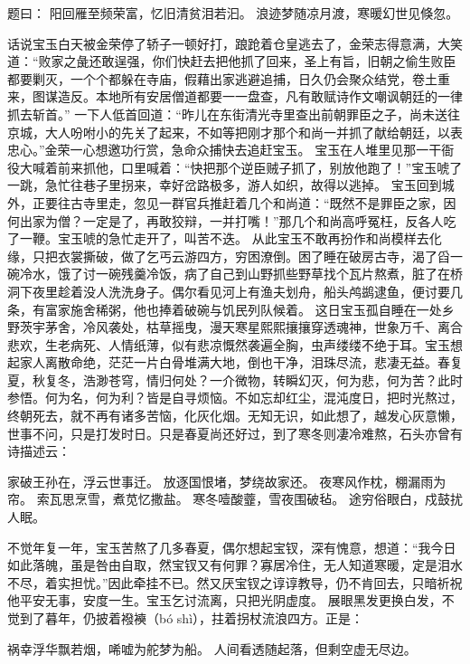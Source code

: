 \documentclass[12pt,oneside]{book}
\begin{document}
题曰：
阳回雁至频荣富，忆旧清贫泪若汩。
浪迹梦随凉月渡，寒暖幻世见倏忽。

话说宝玉白天被金荣停了轿子一顿好打，踉跄着仓皇逃去了，金荣志得意满，大笑道：“败家之彘还敢逞强，你们快赶去把他抓了回来，圣上有旨，旧朝之偷生败臣都要剿灭，一个个都躲在寺庙，假藉出家逃避追捕，日久仍会聚众结党，卷土重来，图谋造反。本地所有安居僧道都要一一盘查，凡有敢赋诗作文嘲讽朝廷的一律抓去斩首。”
一下人低首回道：“昨儿在东街清光寺里查出前朝罪臣之子，尚未送往京城，大人吩咐小的先关了起来，不如等把刚才那个和尚一并抓了献给朝廷，以表忠心。”金荣一心想邀功行赏，急命众捕快去追赶宝玉。
宝玉在人堆里见那一干衙役大喊着前来抓他，口里喊着：“快把那个逆臣贼子抓了，别放他跑了！”宝玉唬了一跳，急忙往巷子里拐来，幸好岔路极多，游人如织，故得以逃掉。
宝玉回到城外，正要往古寺里走，忽见一群官兵推赶着几个和尚道：“既然不是罪臣之家，因何出家为僧？一定是了，再敢狡辩，一并打嘴！”那几个和尚高呼冤枉，反各人吃了一鞭。宝玉唬的急忙走开了，叫苦不迭。
从此宝玉不敢再扮作和尚模样去化缘，只把衣裳撕破，做了乞丐云游四方，穷困潦倒。困了睡在破房古寺，渴了舀一碗冷水，饿了讨一碗残羹冷饭，病了自己到山野抓些野草找个瓦片熬煮，脏了在桥洞下夜里趁着没人洗洗身子。偶尔看见河上有渔夫划舟，船头鸬鹚逮鱼，便讨要几条，有富家施舍稀粥，他也捧着破碗与饥民列队候着。
这日宝玉孤自睡在一处乡野茨宇茅舍，冷风袭处，枯草摇曳，漫天寒星熙熙攘攘穿透魂神，世象万千、离合悲欢，生老病死、人情纸薄，似有悲凉慨然袭遍全胸，虫声缕缕不绝于耳。宝玉想起家人离散命绝，茫茫一片白骨堆满大地，倒也干净，泪珠尽流，悲凄无益。春复夏，秋复冬，浩渺苍穹，情归何处？一介微物，转瞬幻灭，何为悲，何为苦？此时参悟。何为名，何为利？皆是自寻烦恼。不如忘却红尘，混沌度日，把时光熬过，终朝死去，就不再有诸多苦恼，化灰化烟。无知无识，如此想了，越发心灰意懒，世事不问，只是打发时日。只是春夏尚还好过，到了寒冬则凄冷难熬，石头亦曾有诗描述云：

家破王孙在，浮云世事迁。
放逐国恨堵，梦绕故家还。
夜寒风作枕，棚漏雨为帘。 
索瓦思烹雪，煮苋忆撒盐。 
寒冬噎酸虀，雪夜围破毡。 
途穷俗眼白，戍鼓扰人眠。 

不觉年复一年，宝玉苦熬了几多春夏，偶尔想起宝钗，深有愧意，想道：“我今日如此落魄，虽是咎由自取，然宝钗又有何罪？寡居冷住，无人知道寒暖，定是泪水不尽，着实担忧。”因此牵挂不已。然又厌宝钗之谆谆教导，仍不肯回去，只暗祈祝他平安无事，安度一生。宝玉乞讨流离，只把光阴虚度。
展眼黑发更换白发，不觉到了暮年，仍披着襏襫（bó shì），拄着拐杖流浪四方。正是：

祸幸浮华飘若烟，唏嘘为舵梦为船。
人间看透随起落，但剩空虚无尽边。
\end{document}
